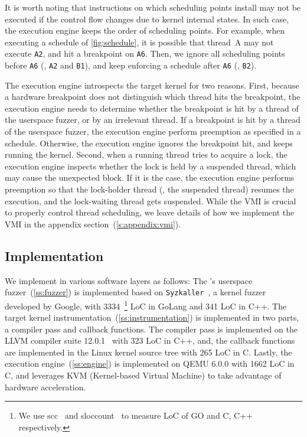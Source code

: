 %
%
It is worth noting that instructions on which scheduling points
install may not be executed if the control flow changes due to kernel
internal states.
%
In such case, the execution engine keeps the order of scheduling
points.
%
\dr{}
For example, when executing a schedule of \autoref{fig:schedule}, it
is possible that thread~A may not execute \texttt{A2}, and hit a
breakpoint on \texttt{A6}.
%
Then, we ignore all scheduling points before \texttt{A6} (\ie,
\texttt{A2} and \texttt{B1}), and keep enforcing a schedule after
\texttt{A6} (\ie, \texttt{B2}).



%
The execution engine introspects the target kernel for two reasons.
%
First, because a hardware breakpoint does not distinguish which thread
hits the breakpoint, the execution engine needs to determine whether
the breakpoint is hit by a thread of the userspace fuzzer, or by an
irrelevant thread.
%
If a breakpoint is hit by a thread of the userspace fuzzer, the
execution engine perform preemption as specified in a schedule.
%
Otherwise, the execution engine ignores the breakpoint hit, and keeps
running the kernel.
%
Second, when a running thread tries to acquire a lock, the execution
engine inspects whether the lock is held by a suspended thread, which
may cause the unexpected block.
%
If it is the case, the execution engine performs preemption so that
the lock-holder thread (\ie, the suspended thread) resumes the
execution, and the lock-waiting thread gets suspended.
%
While the VMI is crucial to properly control thread scheduling, we
leave details of how we implement the VMI in the appendix
section~(\autoref{s:appendix:vmi}).




\subsection{Implementation}
\label{ss:impl}

We implement \sys in various software layers as follows:
%
The \sys's userspace fuzzer~(\autoref{ss:fuzzer}) is implemented based
on \texttt{Syzkaller}~\cite{syzkaller}, a kernel fuzzer developed by
Google, with 3334~\footnote{We use scc~\cite{scc} and
  sloccount~\cite{sloccount} to measure LoC of GO and C, C++
  respectively.} LoC in GoLang and 341 LoC in C++.
%
The target kernel instrumentation~(\autoref{ss:instrumentation}) is
implemented in two parts, a compiler pass and callback functions. The
compiler pass is implemented on the LLVM compiler suite
12.0.1~\cite{llvm} with 323 LoC in C++, and, the callback functions are
implemented in the Linux kernel source tree with 265 LoC in C.
%
Lastly, the execution engine~(\autoref{ss:engine}) is implemented on QEMU
6.0.0 with 1662 LoC in C, and leverages KVM (Kernel-based Virtual
Machine) to take advantage of hardware acceleration.
%



